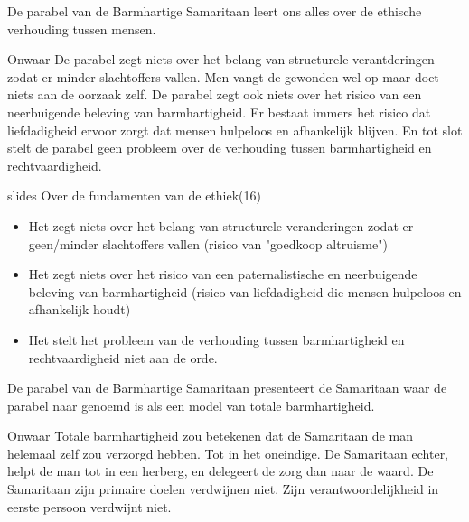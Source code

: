\documentclass[main.tex]{subfiles}
\begin{document}
\begin{examenvraag}
    \begin{stelling}
        De parabel van de Barmhartige Samaritaan leert ons alles over de ethische verhouding tussen mensen.
    \end{stelling}

   

    \begin{stelling-antwoord}{Onwaar}
    	De parabel zegt niets over het belang van structurele verantderingen zodat er minder 
    	slachtoffers vallen.‭ ‬Men vangt de gewonden wel op maar doet niets aan de oorzaak zelf.‭ ‬De 
    	parabel zegt ook niets over het risico van een neerbuigende beleving‭ ‬van barmhartigheid.‭ ‬Er 
    	bestaat immers het risico dat liefdadigheid ervoor zorgt dat mensen hulpeloos en 
    	afhankelijk blijven.‭ ‬En tot slot stelt de parabel geen probleem over de verhouding tussen 
    	barmhartigheid en rechtvaardigheid.
        \begin{citaat}{slides Over de fundamenten van de ethiek(16)}
            \begin{itemize}
                \item Het zegt niets over het belang van structurele veranderingen zodat er geen/minder slachtoffers vallen (risico van "goedkoop altruisme")
                \item Het zegt niets over het risico van een paternalistische en neerbuigende beleving van barmhartigheid (risico van liefdadigheid die mensen hulpeloos en afhankelijk houdt)
                \item Het stelt het probleem van de verhouding tussen barmhartigheid en rechtvaardigheid niet aan de orde.
            \end{itemize}
        \end{citaat}
    \end{stelling-antwoord}

\end{examenvraag}


\begin{examenvraag}
    \begin{stelling}
        De parabel van de Barmhartige Samaritaan presenteert de Samaritaan waar de parabel naar genoemd is als een model van totale barmhartigheid.
    \end{stelling}

    \begin{stelling-antwoord}{Onwaar}
        Totale barmhartigheid zou betekenen dat de Samaritaan de man helemaal zelf zou verzorgd hebben.
        Tot in het oneindige.
        De Samaritaan echter, helpt de man tot in een herberg, en delegeert de zorg dan naar de waard.
        De Samaritaan zijn primaire doelen verdwijnen niet.
        Zijn verantwoordelijkheid in eerste persoon verdwijnt niet.
    \end{stelling-antwoord}
\end{examenvraag}
\end{document}
